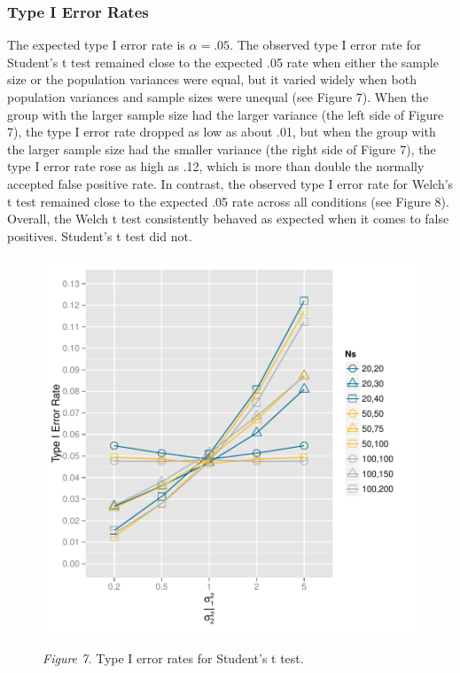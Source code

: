 \documentclass[man,a4paper,noextraspace,apacite]{apa6}
\begin{document}
\subsubsection{Type I Error Rates}

    The expected type I error rate is $\alpha = .05$. The observed type I error rate for Student's t test remained close to the expected .05 rate when either the sample size or the population variances were equal, but it varied widely when both population variances and sample sizes were unequal (see Figure 7). When the group with the larger sample size had the larger variance (the left side of Figure 7), the type I error rate dropped as low as about .01, but when the group with the larger sample size had the smaller variance (the right side of Figure 7), the type I error rate rose as high as .12, which is more than double the normally accepted false positive rate. In contrast, the observed type I error rate for Welch's t test remained close to the expected .05 rate across all conditions (see Figure 8). Overall, the Welch t test consistently behaved as expected when it comes to false positives. Student's t test did not.

\begin{figure}    
\includegraphics{WelchManuscript-abridged-type1classicplot}

\textit{Figure 7.} Type I error rates for Student's t test.
\end{figure}
\end{document}
